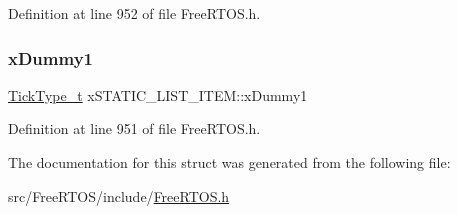 Definition at line 952 of file Free\+R\+T\+O\+S.\+h.

\mbox{\label{structx_s_t_a_t_i_c___l_i_s_t___i_t_e_m_abdb8e415f1bcfbba19fbf57d8d4e9438}} 
\subsubsection{\texorpdfstring{x\+Dummy1}{xDummy1}}
{\footnotesize\ttfamily \hyperlink{portmacro_8h_aa69c48c6e902ce54f70886e6573c92a9}{Tick\+Type\+\_\+t} x\+S\+T\+A\+T\+I\+C\+\_\+\+L\+I\+S\+T\+\_\+\+I\+T\+E\+M\+::x\+Dummy1}



Definition at line 951 of file Free\+R\+T\+O\+S.\+h.



The documentation for this struct was generated from the following file\+:\begin{DoxyCompactItemize}
\item 
src/\+Free\+R\+T\+O\+S/include/\hyperlink{_free_r_t_o_s_8h}{Free\+R\+T\+O\+S.\+h}\end{DoxyCompactItemize}
